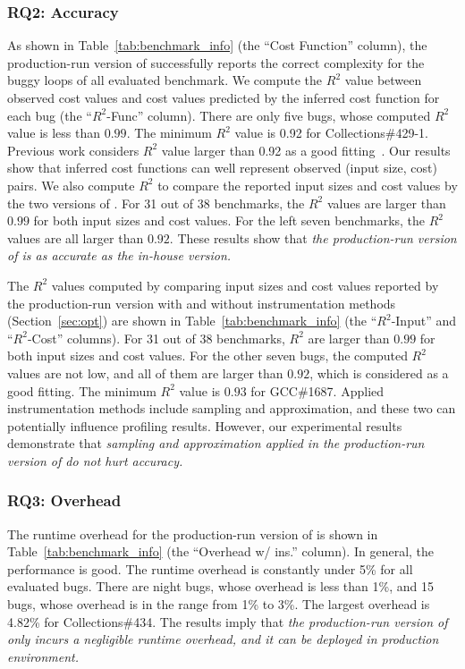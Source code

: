 \subsubsection{RQ2: Accuracy}
As shown in Table~\ref{tab:benchmark_info} (the ``Cost Function'' column),
the production-run version of \Tool successfully 
reports the correct complexity for the buggy loops of 
all evaluated benchmark. 
We compute the $R^2$ value between observed cost values and 
cost values predicted by the inferred cost function for each bug 
(the ``$R^2$-Func'' column).  
There are only five bugs, whose computed $R^2$ value is less than $0.99$.
The minimum $R^2$ value is 0.92 for Collections\#429-1. 
Previous work considers $R^2$ value larger than 0.92 
as a good fitting~\cite{rsquare-value}.
Our results show that inferred cost functions can well represent 
observed (input size, cost) pairs. 
We also compute $R^2$ to compare the reported input sizes 
and cost values by the two versions of \Tool. 
For 31 out of 38 benchmarks, 
the $R^2$ values are larger than $0.99$ for both input sizes and cost values. 
For the left seven benchmarks, the $R^2$ values are all larger than $0.92$. 
These results show that \emph{the production-run version of \Tool is 
as accurate as the in-house version. 
}

The $R^2$ values computed by comparing input sizes and cost values 
reported by the production-run version with and without 
instrumentation methods (Section~\ref{sec:opt}) are shown in 
Table~\ref{tab:benchmark_info} 
(the ``$R^2$-Input'' and ``$R^2$-Cost'' columns).
For 31 out of 38 benchmarks, $R^2$ are larger than $0.99$ for 
both input sizes and cost values. 
For the other seven bugs, the computed $R^2$ values are not low, 
and all of them are larger than $0.92$, which is considered as a good fitting. 
The minimum $R^2$ value is $0.93$ for GCC\#1687.
Applied instrumentation methods include
sampling and approximation, and these two can potentially influence profiling results.
However, our experimental results demonstrate that \emph{sampling and approximation 
applied in the production-run version of \Tool do not hurt accuracy. 
}

\subsubsection{RQ3: Overhead}

The runtime overhead for the production-run version of \Tool is 
shown in Table~\ref{tab:benchmark_info} (the ``Overhead w/ ins.'' column). 
In general, the performance is good. 
The runtime overhead is constantly 
under 5\% for all evaluated bugs. 
There are night bugs, whose overhead is less than 1\%, 
and 15 bugs, whose overhead is in the range from 1\% to 3\%.  
The largest overhead is 4.82\% for Collections\#434. 
The results imply that \emph{the production-run version of 
\Tool only incurs a negligible runtime overhead, 
and it can be deployed in production environment.}


